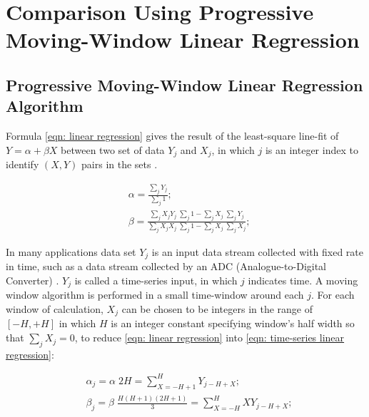 \documentclass[twoside]{article}
\numberwithin{equation}{section}
\begin{document}
\clearpage
\section{Comparison Using Progressive Moving-Window Linear Regression}
\label{sec: Comparison Using Progressive Moving-Window Linear Regression}

\subsection{Progressive Moving-Window Linear Regression Algorithm}

Formula \eqref{eqn: linear regression} gives the result of the least-square line-fit of $Y = \alpha + \beta X$ between two set of data ${Y_j}$ and ${X_j}$, in which $j$ is an integer index to identify $(X, Y)$ pairs in the sets \cite{Numerical_Recipes}.

\begin{equation}
\begin{split}
\label{eqn: linear regression}
& \alpha = \frac{\sum_{j} Y_{j} }{\sum_{j} 1}; \\
& \beta = \frac{\sum_{j} X_{j} Y_{j} \; \sum_{j} 1 - \sum_{j} X_{j} \; \sum_{j} Y_{j}}
    {\sum_{j} X_{j} X_{j} \; \sum_{j} 1 - \sum_{j} X_{j} \; \sum_{j} X_{j} };
\end{split}
\end{equation}

In many applications data set ${Y_j}$ is an input data stream collected with fixed rate in time, such as a data stream collected by an ADC (Analogue-to-Digital Converter) \cite{Electronics}.  ${Y_j}$ is called a time-series input, in which $j$ indicates time.  A moving window algorithm \cite{Numerical_Recipes} is performed in a small time-window around each $j$.  For each window of calculation, ${X_j}$ can be chosen to be integers in the range of $[-H, +H]$ in which $H$ is an integer constant specifying window’s half width so that $\sum_{j} X_{j} = 0$, to reduce \eqref{eqn: linear regression} into \eqref{eqn: time-series linear regression}:

\begin{equation}
\begin{split}
\label{eqn: time-series linear regression}
& \alpha _{j} = \alpha \; 2 H = \sum_{X=-H+1}^{H} Y_{j-H+X}; \\
& \beta _{j} = \beta \; \frac{H (H+1)(2H+1)}{3} = \sum_{X=-H}^{H} X Y_{j-H+X}; \\
\end{split}
\end{equation}
\end{document}
